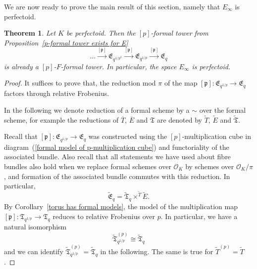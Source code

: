 \documentclass[10pt,oneside]{amsart}
\newtheorem{theorem}{Theorem}[section]
\theoremstyle{definition}
\begin{document}
	We are now ready to prove the main result of this section, namely that $E_\infty$ is perfectoid.
	\begin{theorem}\label{p-F-formal tower exists for E}
		Let $K$ be perfectoid. Then the $[p]$-formal tower from Proposition~\ref{p-formal tower exists for E}
		\[\dots \xrightarrow{[\mathfrak p]} \mathfrak E_{q^{1/p^2}}\xrightarrow{[\mathfrak p]} \mathfrak E_{q^{1/p}}\xrightarrow{[\mathfrak p]} \mathfrak E_q\]
		 is already a $[p]$-$F$-formal tower.
		In particular, the space $E_\infty$ is perfectoid.
	\end{theorem}
	\begin{proof}
	
	It suffices to prove that, the reduction mod $\pi$ of the map $[\mathfrak p]:\mathfrak E_{q^{1/p}}\xrightarrow{} \mathfrak E_q$ factors through relative Frobenius.
	
	In the following we denote reduction of a formal scheme by a $\sim$ over the formal scheme, for example the reductions of $\overline{T}$, $\overline{E}$ and $\mathfrak T$ are denoted by $\tilde{T}$, $\tilde{E}$ and $\tilde{\mathfrak{T}}$.
	
		
	Recall that $[\mathfrak p]:\mathfrak E_{q^{1/p}}\xrightarrow{} \mathfrak E_q$ was constructed using the $[p]$-multiplication cube in diagram~(\ref{formal model of p-multiplication cube}) and functoriality of the associated bundle. 	
	Also recall that all statements we have used about fibre bundles also hold when we replace formal schemes over $\mathcal O_K$ by schemes over $\mathcal O_K/\pi$, and formation of the associated bundle commutes with this reduction. In particular,
	\[\tilde{\mathfrak{E}}_q = \tilde{\mathfrak T}_q\times^{\tilde{T}}\tilde E.\]
	By  Corollary~\ref{torus has formal models}, the model of the multiplication map $[\mathfrak p]:\mathfrak T_{q^{1/p}} \rightarrow \mathfrak T_{q}$ reduces to relative Frobenius over $p$. In particular, we have a natural isomorphism
	\[\tilde{\mathfrak T}_{q^{1/p}}^{(p)} \cong \tilde{\mathfrak T}_{q}\]
	and we can identify $\tilde{\mathfrak T}_{q^{1/p}}^{(p)} = \tilde{\mathfrak T}_{q}$ in the following. The same is true for $\tilde{T}^{(p)} = \tilde{T}$.
	

\end{proof}
\end{document}
